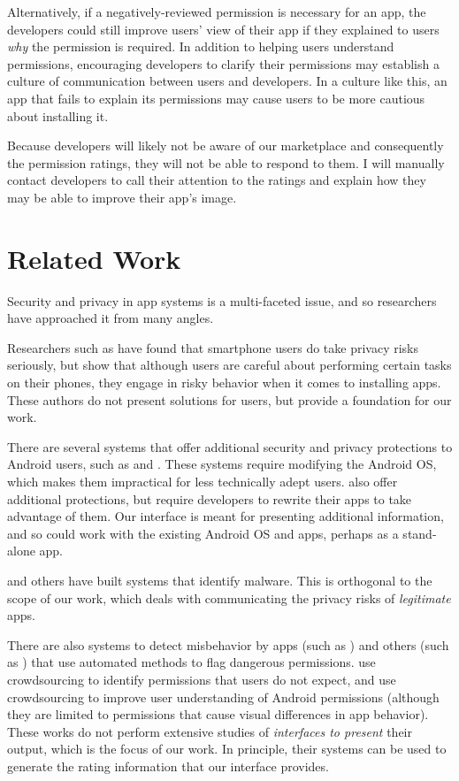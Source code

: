 \documentclass[11pt]{article}
\begin{document}
Alternatively, if a negatively-reviewed permission is necessary for
an app, the developers could still improve users' view of their app
if they explained to users \emph{why} the permission is required. In 
addition to helping users understand permissions, encouraging developers 
to clarify their permissions may establish a culture of communication
between users and developers. In a culture like this, an app that fails
to explain its permissions may cause users to be more cautious about 
installing it. 

Because developers will likely not be aware of our marketplace and 
consequently the permission ratings, they will not be able to respond 
to them. I will manually contact developers to call their attention
to the ratings and explain how they may be able to improve their 
app's image.


\section{Related Work}

Security and privacy in app systems is a multi-faceted issue, and 
so researchers have approached it from many angles.

Researchers such as \citet{99-problems-SPSM12} have found 
that smartphone users do take privacy risks seriously, but
\citet{smartphone-user-conf-SOUPS12} show that although
users are careful about
performing certain tasks on their phones, they engage in risky behavior
when it comes to installing apps. These
authors do not present solutions for users, but 
provide a foundation for our work.

There are several systems that offer additional 
security and privacy protections to Android users, such as 
\citet{mockDroid-HOTMOBILE11} and \citet{TISSA-Trust11}. 
These systems require modifying
the Android OS, which makes them impractical
for less technically adept users. 
\citet{dr-android-hide-SPSM12} also offer additional
protections, but require developers to rewrite their
apps to take advantage of them.
Our interface is meant
for presenting additional information, and so could work
with the existing Android OS and apps, perhaps as a stand-alone app.

\citet{android-repackaged-CODASPY12} and others have
built systems that identify
malware. This is orthogonal to the scope of our work, which
deals with communicating the privacy risks of \emph{legitimate} apps.

There are also systems to detect misbehavior by apps (such as
\citet{taintDroid-OSDI10})
and others (such as \citet{droidrisk-2013}) that use
automated methods to flag dangerous permissions.
\citet{expect-purpose-UbiComp12}
use crowdsourcing to identify permissions that users do not expect,
and \citet{droidganger-SPSM12} use crowdsourcing to improve user 
understanding of Android permissions (although they are limited
to permissions that cause visual differences in app behavior). 
These works do not perform
extensive studies of \emph{interfaces to present} their output, which
is the focus of our work. In principle, their systems can be used to
generate the rating information that our interface provides.
\end{document}
